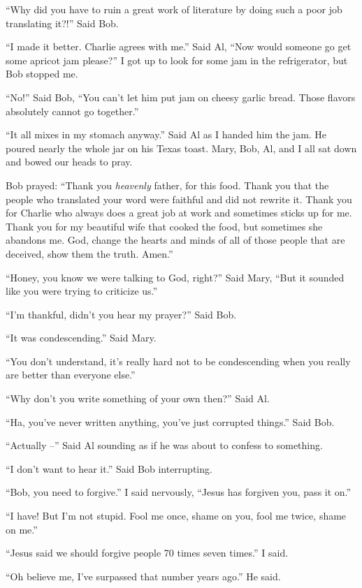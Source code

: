 ``Why did you have to ruin a great work of literature by doing such a poor job translating it?!'' Said Bob.

``I made it better. Charlie agrees with me.'' Said Al, ``Now would someone go get some apricot jam please?'' I got up to look for some jam in the refrigerator, but Bob stopped me.

``No!'' Said Bob, ``You can't let him put jam on cheesy garlic bread. Those flavors absolutely cannot go together.''

``It all mixes in my stomach anyway.'' Said Al as I handed him the jam. He poured nearly the whole jar on his Texas toast. Mary, Bob, Al, and I all sat down and bowed our heads to pray.

Bob prayed: ``Thank you \emph{heavenly} father, for this food. Thank you that the people who translated your word were faithful and did not rewrite it. Thank you for Charlie who always does a great job at work and sometimes sticks up for me. Thank you for my beautiful wife that cooked the food, but sometimes she abandons me. God, change the hearts and minds of all of those people that are deceived, show them the truth. Amen.''

``Honey, you know we were talking to God, right?'' Said Mary,
``But it sounded like you were trying to criticize us.''

``I'm thankful, didn't you hear my prayer?'' Said Bob.

``It was condescending.'' Said Mary.

``You don't understand, it's really hard not to be condescending when you really are better than everyone else.''

``Why don't you write something of your own then?'' Said Al.

``Ha, you've never written anything, you've just corrupted things.'' Said Bob.

``Actually --'' Said Al sounding as if he was about to confess to something.

``I don't want to hear it.'' Said Bob interrupting.

``Bob, you need to forgive.'' I said nervously, ``Jesus has forgiven you, pass it on.''

``I have! But I'm not stupid. Fool me once, shame on you, fool me twice, shame on me.''

``Jesus said we should forgive people 70 times seven times.'' I said.

``Oh believe me, I've surpassed that number years ago.'' He said.

